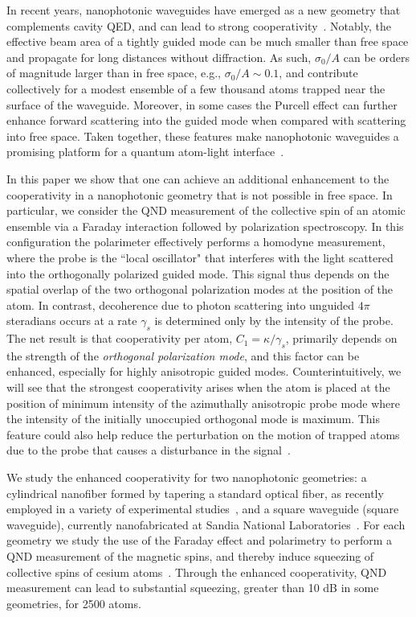 \documentclass[preprint,aps,pra,onecolumn,superscriptaddress]{revtex4-1} %
\begin{document}
In recent years, nanophotonic waveguides have emerged as a new geometry that complements cavity QED, and can lead to strong cooperativity~\cite{Yu2014,Hung2013,Goban2014,Goban2012,Sayrin2015,Sayrin2015a}.  Notably, the effective beam area of a tightly guided mode can be much smaller than free space and propagate for long distances without diffraction.  As such,  $\sigma_0/A$ can be orders of magnitude larger than in free space, e.g., $\sigma_0/A \sim 0.1$, and contribute collectively for a modest ensemble of a few thousand atoms trapped near the surface of the waveguide.  Moreover, in some cases the Purcell effect can further enhance forward scattering into the guided mode when compared with scattering into free space.  Taken together, these features make  nanophotonic waveguides a promising platform for a quantum atom-light interface~\cite{Douglas2015,Chang2013,Asenjo-Garcia2017Exponential,Vetsch2010Optical,Dawkins2011,Qi2016}.
 
In this paper we show that one can achieve an additional enhancement to the cooperativity in a nanophotonic geometry that is not possible in free space. In particular, we consider the QND measurement of the collective spin of an atomic ensemble via a Faraday interaction followed by polarization spectroscopy.  In this configuration the polarimeter effectively performs a homodyne measurement, where the probe is the ``local oscillator" that interferes with the light scattered into the orthogonally polarized guided mode.   This signal thus depends on the spatial overlap of the two orthogonal polarization modes at the position of the atom.  In contrast, decoherence due to photon scattering into unguided $4 \pi$ steradians occurs at a rate $\gamma_s$ is determined only by the intensity of the probe.   The net result is that cooperativity per atom, $C_1 = \kappa/\gamma_s$, primarily depends on the strength of the {\em orthogonal polarization mode}, and this factor can be enhanced, especially for highly anisotropic guided modes.  Counterintuitively, we will see that the strongest cooperativity arises when the atom is placed at the position of  minimum intensity of the azimuthally anisotropic probe mode where the intensity of the initially unoccupied orthogonal mode is maximum. This feature could also help reduce the perturbation on the motion of trapped atoms due to the probe that causes a disturbance in the signal~\cite{Solano2017Dynamics}.  

We study the enhanced cooperativity for two nanophotonic geometries: a cylindrical nanofiber formed by tapering a standard optical fiber, as recently employed in a variety of experimental studies~\cite{Nayak2008,Vetsch2010Optical,Vetsch2010Opticala,OShea2013,Goban2014,Grover2015,Lee2015,Beguin2014}, and a square waveguide (square waveguide), currently nanofabricated at Sandia National Laboratories~\cite{Jau2016Development,Lee2017Characterizations,Lee2013}.  For each geometry we study the use of the Faraday effect and polarimetry to perform a QND measurement of the magnetic spins, and thereby induce squeezing of collective spins of cesium atoms~\cite{Takahashi1999Quantum,Kuzmich1999,Kuzmich2000,Deutsch2010a,Smith2003a}.  Through the enhanced cooperativity, QND measurement can lead to substantial squeezing, greater than 10 dB in some geometries, for 2500 atoms.
\end{document}
